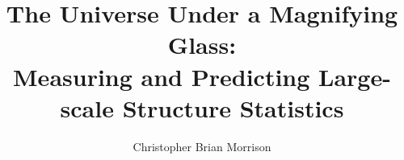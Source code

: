 \documentclass[12pt]{ucdavisthesis}
\title          {The Universe Under a Magnifying Glass:\\
		Measuring and Predicting Large-scale Structure Statistics}
\author         {Christopher Brian Morrison}
\begin{document}
\renewcommand{\bibfont}{\singlespacing}
 


\makeintropages %











\end{document}
